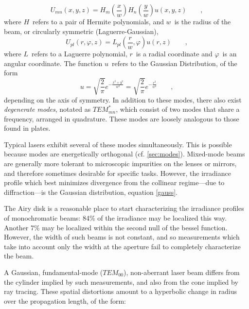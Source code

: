 \documentclass[a4paper,10pt]{report}
\numberwithin{equation}{section}
\begin{document}
{\begin{section}
\begin{equation}
U_{mn}(x, y, z) = H_m\left(\frac{x}{w}\right)H_n\left(\frac{y}{w}\right)u(x,y,z)\qquad \text{,}
\end{equation}
where $H$\  refers to a pair of Hermite polynomials, and $w$\  is the radius of the beam, or circularly symmetric (Laguerre-Gaussian),
\begin{equation}
U_{pl}(r, \varphi, z) = L_{pl}\left(\frac{r}{w}, \varphi\right)u(r, z)\qquad \text{,}
\end{equation}
where $L$\  refers to a Laguerre polynomial, $r$\  is a radial coordinate and $\varphi$\  is an angular coordinate. \cite[p.~4]{Marshall2004} The function $u$\  refers to the Gaussian Distribution, of the form
\begin{equation}
u = \sqrt{ \frac{2}{\pi}} e^{-\frac{x^2 + y^2}{w^2}} = \sqrt{ \frac{2}{\pi}}e^{-\frac{r^2}{w^2}} \qquad \text{,}
\end{equation}
depending on the axis of symmetry. \cite[p.~5]{Marshall2004} In addition to these modes, there also exist \emph{degenerate modes}, notated as $TEM_{mn}^*$, which consist of two modes that share a frequency, arranged in quadrature. \cite[p.~6]{Marshall2004} These modes are loosely analogous to those found in plates. 
\par
Typical lasers exhibit several of these modes simultaneously. This is possible because modes are energetically orthogonal (cf. \ref{sec:modes}). Mixed-mode beams are generally more tolerant to microscopic impurities on the lenses or mirrors, and therefore sometimes desirable for specific tasks. However, the irradiance profile which best minimizes divergence from the collinear regime---due to diffraction---is the Gaussian distribution, equation \eqref{gauss}. \cite[p.~13]{Marshall2004} 
\par
The Airy disk is a reasonable place to start characterizing the irradiance profiles of monochromatic beams: 84\% of the irradiance may be localized this way. Another 7\% may be localized within the second null of the bessel function. However, the width of such beams is not constant, and so measurements which take into account only the width at the aperture fail to completely characterize the beam.\cite[p.~2]{Marshall2004} 
\par
A Gaussian, fundamental-mode ($TEM_{00}$), non-aberrant laser beam differs from the cylinder implied by such measurements, and also from the cone implied by ray tracing. These spatial distortions amount to a hyperbolic change in radius over the propagation length, of the form:\cite[p.~562]{Hecht1987}

\end{section}}
\end{document}
